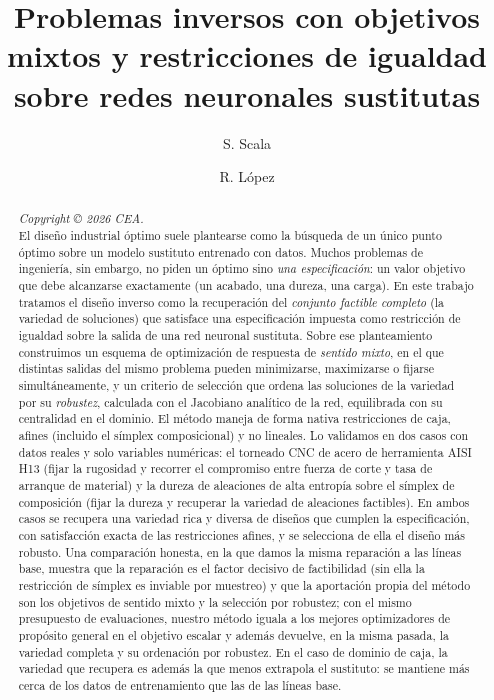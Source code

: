\documentclass[5p,times,authoryear]{elsarticle}
\begin{document}
\begin{frontmatter}

\title{Problemas inversos con objetivos mixtos y restricciones de igualdad
sobre redes neuronales sustitutas}

\author[nd]{S. Scala}
\author[nd]{R. López}
\address[nd]{Artelnics, Salamanca, España.}

\begin{abstract}
\emph{Copyright {\copyright} 2026 CEA.}\\
El diseño industrial óptimo suele plantearse como la búsqueda de un único punto
óptimo sobre un modelo sustituto entrenado con datos. Muchos problemas de
ingeniería, sin embargo, no piden un óptimo sino \emph{una especificación}: un
valor objetivo que debe alcanzarse exactamente (un acabado, una dureza, una
carga). En este trabajo tratamos el diseño inverso como la recuperación del
\emph{conjunto factible completo} (la variedad de soluciones) que satisface una
especificación impuesta como restricción de igualdad sobre la salida de una red
neuronal sustituta. Sobre ese planteamiento construimos un esquema de
optimización de respuesta de \emph{sentido mixto}, en el que distintas salidas
del mismo problema pueden minimizarse, maximizarse o fijarse simultáneamente, y
un criterio de selección que ordena las soluciones de la variedad por su
\emph{robustez}, calculada con el Jacobiano analítico de la red, equilibrada con
su centralidad en el dominio. El método maneja de forma nativa restricciones de
caja, afines (incluido el símplex composicional) y no lineales. Lo validamos en
dos casos con datos reales y solo variables numéricas: el torneado CNC de acero
de herramienta AISI H13 (fijar la rugosidad y recorrer el compromiso entre fuerza de corte y
tasa de arranque de material) y la dureza de aleaciones de alta
entropía sobre el símplex de composición (fijar la dureza y recuperar la
variedad de aleaciones factibles). En ambos casos se recupera una variedad rica
y diversa de diseños que cumplen la especificación, con satisfacción exacta de
las restricciones afines, y se selecciona de ella el diseño más robusto. Una
comparación honesta, en la que damos la misma reparación a las líneas base,
muestra que la reparación es el factor decisivo de factibilidad (sin ella la
restricción de símplex es inviable por muestreo) y que la aportación propia del
método son los objetivos de sentido mixto y la selección por robustez; con el mismo
presupuesto de evaluaciones, nuestro método iguala a los mejores optimizadores de
propósito general en el objetivo escalar y además devuelve, en la misma pasada, la
variedad completa y su ordenación por robustez. En el caso de dominio de caja, la
variedad que recupera es además la que menos extrapola el sustituto: se mantiene más
cerca de los datos de entrenamiento que las de las líneas base.
\end{abstract}


\end{frontmatter}
\end{document}
